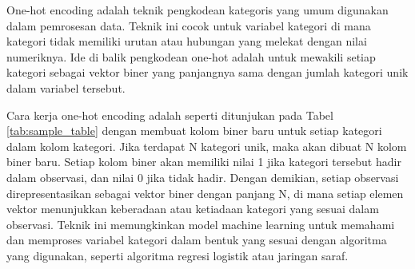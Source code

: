 One-hot encoding adalah teknik pengkodean kategoris yang umum digunakan dalam pemrosesan data. Teknik ini cocok untuk variabel kategori di mana kategori tidak memiliki urutan atau hubungan yang melekat dengan nilai numeriknya. Ide di balik pengkodean one-hot adalah untuk mewakili setiap kategori sebagai vektor biner yang panjangnya sama dengan jumlah kategori unik dalam variabel tersebut.

\begin{table}[htbp]
    \caption{Sample Encoding Data}
    \centering
    \label{tab:sample_table}
\end{table}


Cara kerja one-hot encoding adalah seperti ditunjukan pada Tabel \ref{tab:sample_table} dengan membuat kolom biner baru untuk setiap kategori dalam kolom kategori. Jika terdapat N kategori unik, maka akan dibuat N kolom biner baru. 
Setiap kolom biner akan memiliki nilai 1 jika kategori tersebut hadir dalam observasi, dan nilai 0 jika tidak hadir. Dengan demikian, setiap observasi direpresentasikan sebagai vektor biner dengan panjang N, di mana setiap elemen vektor menunjukkan keberadaan atau ketiadaan kategori yang sesuai dalam observasi. Teknik ini memungkinkan model machine learning untuk memahami dan memproses variabel kategori dalam bentuk yang sesuai dengan algoritma yang digunakan, seperti algoritma regresi logistik atau jaringan saraf.